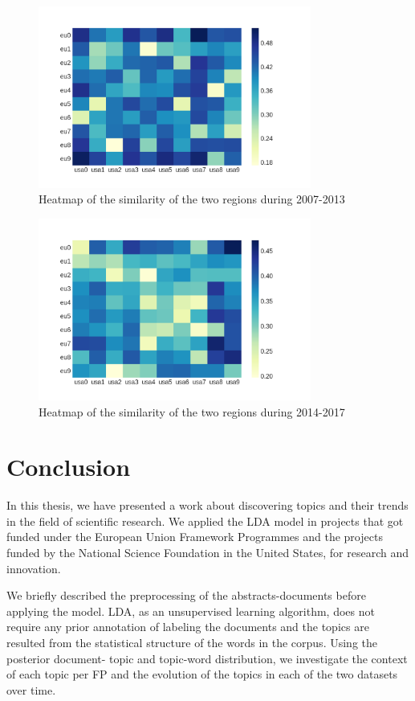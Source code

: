 \documentclass[12pt]{report}
\begin{document}
\begin{figure}[H]
\centering
\includegraphics[width=0.8\textwidth]
{figs/heatmaps/heatmapFP7.png}
\caption{Heatmap of the similarity of the two regions during 2007-2013}
\label{heatmap7}
\end{figure}

\begin{figure}[H]
\centering
\includegraphics[width=0.8\textwidth]
{figs/heatmaps/heatmapH2020.png}
\caption{Heatmap of the similarity of the two regions during 2014-2017}
\label{heatmap20}
\end{figure}
\vfill

\section{Conclusion}
\label{conclusion}
In this thesis, we have presented a work about discovering topics and their
trends in the field of scientific research. We applied the LDA model in projects
that got funded under the European Union Framework Programmes and the projects
funded by the National Science Foundation in the United States, for research and
innovation.

We briefly described the preprocessing of the
abstracts-documents before applying the model. LDA, as an unsupervised
learning algorithm, does not require any prior annotation of labeling
the documents and the topics are resulted from the statistical
structure of the words in the corpus. Using the posterior document-
topic and topic-word distribution, we investigate the context of each
topic per FP and the evolution of the topics in each of the two
datasets over time.
\end{document}
